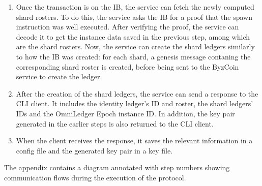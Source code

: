 \begin{enumerate}
	\item Once the transaction is on the IB, the service can fetch the newly computed shard rosters. To do this, the service asks the IB for a proof that the spawn instruction was well executed. After verifying the proof, the service can decode it to get the instance data saved in the previous step, among which are the shard rosters. Now, the service can create the shard ledgers similarly to how the IB was created: for each shard, a genesis message contaning the corresponding shard roster is created, before being sent to the ByzCoin service to create the ledger.
	
	\item After the creation of the shard ledgers, the service can send a response to the CLI client. It includes the identity ledger's ID and roster, the shard ledgers' IDs and the OmniLedger Epoch instance ID. In addition, the key pair generated in the earlier steps is also returned to the CLI client.
	
	\item When the client receives the response, it saves the relevant information in a config file and the generated key pair in a key file.
\end{enumerate}
The appendix contains a diagram annotated with step numbers showing communication flows during the execution of the protocol. 

